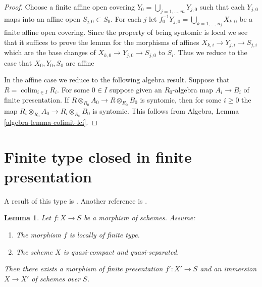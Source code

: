 \documentclass{stacks-project}
\theoremstyle{plain}
\newtheorem{lemma}[subsection]{Lemma}
\theoremstyle{definition}
\theoremstyle{remark}
\numberwithin{equation}{subsection}
\def\colim{\mathop{\mathrm{colim}}\nolimits}
\begin{document}
\begin{proof}
Choose a finite affine open covering
$Y_0 = \bigcup_{j = 1, \ldots, m} Y_{j, 0}$
such that each $Y_{j, 0}$ maps into an affine open
$S_{j, 0} \subset S_0$. For each $j$ let
$f_0^{-1}Y_{j, 0} = \bigcup_{k = 1, \ldots, n_j} X_{k, 0}$ be a
finite affine open covering. Since the property of being syntomic is
local we see that it suffices to prove the lemma for the morphisms
of affines $X_{k, i} \to Y_{j, i} \to S_{j, i}$ which are the base
changes of $X_{k, 0} \to Y_{j, 0} \to S_{j, 0}$ to $S_i$.
Thus we reduce to the case that $X_0, Y_0, S_0$ are affine

\medskip\noindent
In the affine case we reduce to the following algebra result.
Suppose that $R = \colim_{i \in I} R_i$. For some $0 \in I$
suppose given an $R_0$-algebra map $A_i \to B_i$ of finite presentation.
If $R \otimes_{R_0} A_0 \to R \otimes_{R_0} B_0$ is syntomic, then
for some $i \geq 0$ the map
$R_i \otimes_{R_0} A_0 \to R_i \otimes_{R_0} B_0$ is syntomic.
This follows from Algebra,
Lemma \ref{algebra-lemma-colimit-lci}.
\end{proof}





\section{Finite type closed in finite presentation}
\label{section-finite-type-closed-in-finite-presentation}

\noindent
A result of this type is \cite[Satz 2.10]{Kiehl}. Another
reference is \cite{Conrad-Nagata}.

\begin{lemma}
\label{lemma-locally-finite-type-in-finite-presentation}
Let $f : X \to S$ be a morphism of schemes.
Assume:
\begin{enumerate}
\item The morphism $f$ is locally of finite type.
\item The scheme $X$ is quasi-compact and quasi-separated.
\end{enumerate}
Then there exists a morphism of finite presentation
$f' : X' \to S$ and an immersion $X \to X'$ of schemes over $S$.
\end{lemma}
\end{document}
